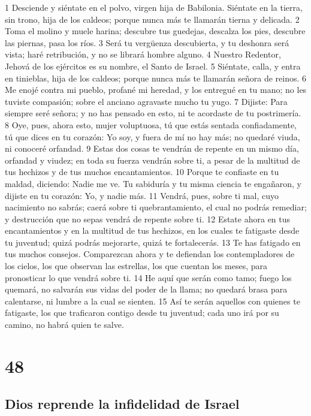 1 Desciende y siéntate en el polvo, virgen hija de Babilonia. Siéntate en la tierra, sin trono, hija de los caldeos; porque nunca más te llamarán tierna y delicada.
2 Toma el molino y muele harina; descubre tus guedejas, descalza los pies, descubre las piernas, pasa los ríos.
3 Será tu vergüenza descubierta, y tu deshonra será vista; haré retribución, y no se librará hombre alguno.
4 Nuestro Redentor, Jehová de los ejércitos es su nombre, el Santo de Israel.
5 Siéntate, calla, y entra en tinieblas, hija de los caldeos; porque nunca más te llamarán señora de reinos.
6 Me enojé contra mi pueblo, profané mi heredad, y los entregué en tu mano; no les tuviste compasión; sobre el anciano agravaste mucho tu yugo.
7 Dijiste: Para siempre seré señora; y no has pensado en esto, ni te acordaste de tu postrimería.
8 Oye, pues, ahora esto, mujer voluptuosa, tú que estás sentada confiadamente, tú que dices en tu corazón: Yo soy, y fuera de mí no hay más; no quedaré viuda, ni conoceré orfandad.
9 Estas dos cosas te vendrán de repente en un mismo día, orfandad y viudez; en toda su fuerza vendrán sobre ti, a pesar de la multitud de tus hechizos y de tus muchos encantamientos.
10 Porque te confiaste en tu maldad, diciendo: Nadie me ve. Tu sabiduría y tu misma ciencia te engañaron, y dijiste en tu corazón: Yo, y nadie más.
11 Vendrá, pues, sobre ti mal, cuyo nacimiento no sabrás; caerá sobre ti quebrantamiento, el cual no podrás remediar; y destrucción que no sepas vendrá de repente sobre ti.
12 Estate ahora en tus encantamientos y en la multitud de tus hechizos, en los cuales te fatigaste desde tu juventud; quizá podrás mejorarte, quizá te fortalecerás.
13 Te has fatigado en tus muchos consejos. Comparezcan ahora y te defiendan los contempladores de los cielos, los que observan las estrellas, los que cuentan los meses, para pronosticar lo que vendrá sobre ti.
14 He aquí que serán como tamo; fuego los quemará, no salvarán sus vidas del poder de la llama; no quedará brasa para calentarse, ni lumbre a la cual se sienten.
15 Así te serán aquellos con quienes te fatigaste, los que traficaron contigo desde tu juventud; cada uno irá por su camino, no habrá quien te salve. 

\chapter{48}

\section*{Dios reprende la infidelidad de Israel}


